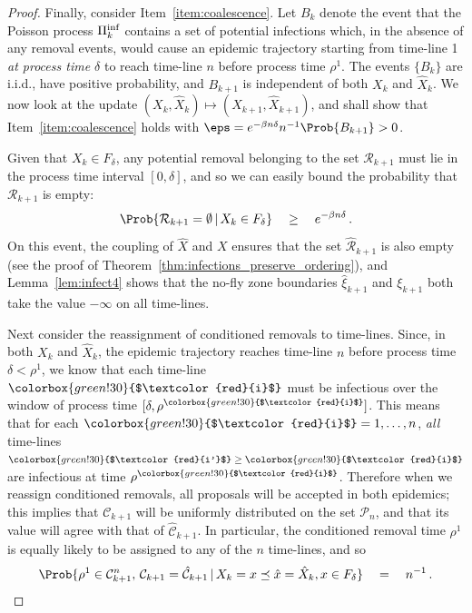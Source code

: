 \documentclass[]{article}
\newcommand{\Conditioned}{\mathcal{C}}
\newcommand{\Removals}{\mathcal{R}}
\newcommand{\Epi}{X}
\newcommand{\Poisson}{\Pi}
\newcommand{\PoissonInf}{\Poisson^\textup{inf}}
\newcommand{\faster}[1]{\hat{#1}}
\newcommand{\slower}[1]{#1}
\newcommand{\target}{{\colorbox{green!30}{$\textcolor{red}{i}$}}}
\newcommand{\targetm}{{\colorbox{green!30}{$\textcolor{red}{i'}$}}}
\begin{document}
\begin{proof}
Finally, consider Item~\ref{item:coalescence}. Let \(B_{k}\) denote the event that the Poisson process \(\PoissonInf_{k}\) contains a set of potential infections which, in the absence of any removal events, would cause an epidemic trajectory starting from time-line 1 \textit{at process time \(\delta\)} to reach time-line \(n\) before process time \(\rho^1\). The events \(\{B_{k}\}\) are i.i.d., have positive probability, and \(B_{k+1}\) is independent of both \(\slower{\Epi}_{k}\) and \(\faster{\Epi}_{k}\). We now look at the update \((\slower{\Epi}_{k}, \faster{\Epi}_{k}) \mapsto (\slower{\Epi}_{k+1}, \faster{\Epi}_{k+1})\), and shall show that Item~\ref{item:coalescence} holds with \(\eps = e^{-\beta n \delta}n^{-1}\Prob{B_{k+1}}>0\).

Given that \(\slower\Epi_{k}\in F_\delta\), any potential removal belonging to the set \(\slower{\Removals}_{k+1}\) must lie in the process time interval \([0,\delta]\), and so we can easily bound the probability that \(\slower{\Removals}_{k+1}\) is empty:
\[ 
 \Prob{\slower\Removals_{k+1} = \emptyset \,|\, \slower\Epi_{k} \in F_\delta} 
 \quad\ge\quad
 e^{-\beta n \delta} \,.
\]
On this event, the coupling of \(\faster{\Epi}\) and \(\slower{\Epi}\) ensures that the set \(\faster \Removals_{k+1}\) is also empty (see the proof of Theorem~\ref{thm:infections_preserve_ordering}), and Lemma~\ref{lem:infect4} shows that the no-fly zone boundaries \(\faster\xi_{k+1}\) and \(\slower{\xi}_{k+1}\) both take the value \(-\infty\) on all time-lines. 

Next consider the reassignment of conditioned removals to time-lines. Since, in both \(\slower{\Epi}_{k}\) and \(\faster{\Epi}_{k}\), the epidemic trajectory reaches time-line \(n\) before process time \(\delta< \rho^1\), we know that each time-line \(\target\)  must be infectious over the window of process time \([\delta,\rho^\target]\). This means that for each \(\target=1,\dots,n\), \textit{all} time-lines \(\targetm \ge \target\) are infectious at time \(\rho^\target\). Therefore when we reassign conditioned removals, all proposals will be accepted in both epidemics; this implies that \(\slower\Conditioned_{k+1}\) will be uniformly distributed on the set \(\mathcal{P}_n\), and that its value will agree with that of \(\faster\Conditioned_{k+1}\). In particular, the conditioned removal time \(\rho^1\) is equally likely to be assigned to any of the \(n\) time-lines, and so 
\[ 
\Prob{\rho^1 \in \slower\Conditioned_{k+1}^n,\,
		\slower\Conditioned_{k+1} = \faster\Conditioned_{k+1} 
		\,|\,
	\slower\Epi_{k}=x \preceq \faster{x} = \faster\Epi_{k}, x\in F_\delta} 
\quad=\quad n^{-1} \,.
\]


\end{proof}
\end{document}

